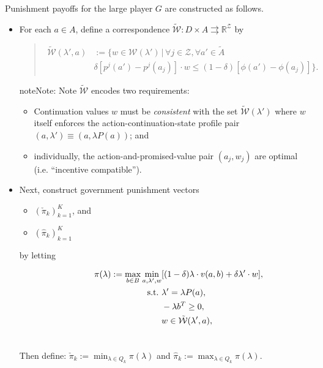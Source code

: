 \documentclass[a4paper,10pt,english]{sphinxmanual}
\begin{document}
Punishment payoffs for the large player $G$ are constructed as follows.
\begin{itemize}
\item {} 
For each $a\in A$, define a correspondence $\tilde{{\mathcal{W}}}:D\times A \rightrightarrows \mathbb{R}^\mathcal{Z}$ by
\begin{quote}
\begin{align*}
\tilde{{\mathcal{W}}}(\lambda',a)&:=\{w\in {\mathcal{W}}(\lambda')\,|\, \forall j\in \mathcal{Z}, \forall a'\in \tilde{A}
\\
& \delta[p^j(a')-p^j(a_j)]\cdot w\leq (1-\delta) [\phi(a')-\phi(a_j)]\}.
\end{align*}\end{quote}

\begin{notice}{note}{Note:}
Note $\tilde{\mathcal{W}}$ encodes two requirements:
\begin{itemize}
\item {} 
Continuation values $w$ must be \emph{consistent} with the set $\tilde{\mathcal{W}}(\lambda')$ where $w$ itself enforces the action-continuation-state profile pair $(a,\lambda') \equiv (a,\lambda P(a))$; and

\item {} 
individually, the action-and-promised-value pair $(a_j, w_j)$
are optimal (i.e. ``incentive compatible'').

\end{itemize}
\end{notice}

\item {} 
Next, construct government punishment vectors
\begin{itemize}
\item {} 
$(\check{\pi}_k)_{k=1}^K$, and

\item {} 
$(\hat{\pi}_k)_{k=1}^K$

\end{itemize}
\begin{description}
\item[{by letting}] \leavevmode{}\label{payoff_bilinear_punish:equation-pival_k}\begin{gather}
\begin{split}\pi(\lambda):=\max_{b\in B} \min_{a,\lambda',w}&[(1-\delta)\lambda\cdot v(a,b)+\delta \lambda'\cdot w],\\
\text{s.t.}\,\,& \lambda'=\lambda P(a),\\
& -\lambda b^T \geq 0,\\
& w\in \tilde{{\mathcal{W}}}(\lambda',a),\end{split}\label{payoff_bilinear_punish-pival_k}\\\begin{split}\end{split}\notag
\end{gather}
\end{description}

Then define: $\check{\pi}_k:=\min_{\lambda\in Q_k}\pi(\lambda)$ and $\hat{\pi}_k:=\max_{\lambda\in Q_k}\pi(\lambda)$.

\end{itemize}
\end{document}
